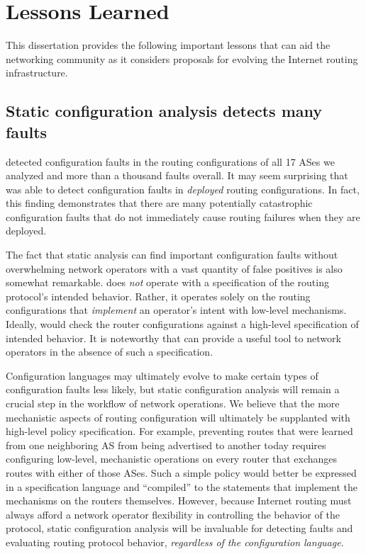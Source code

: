 \section{Lessons Learned}\label{sec:lessons}

This dissertation provides the following important lessons that can aid
the networking community as it considers proposals for evolving the
Internet routing infrastructure.

\subsection{Static configuration analysis detects many faults}

\rcc detected configuration faults in the routing configurations of all 17
ASes we analyzed and more than a thousand faults overall.  It may
seem surprising that \rcc was able to detect configuration faults in
{\em deployed} routing configurations.  In fact, this finding
demonstrates that there are many potentially catastrophic configuration
faults that do not immediately cause routing failures when they are
deployed.

The fact that static analysis can find important configuration faults
without overwhelming network operators with a vast quantity of false
positives is also somewhat remarkable.  \rcc does {\em not} operate with
a specification of the routing protocol's intended behavior.  Rather, it
operates solely on the routing configurations that {\em implement} an
operator's intent with low-level mechanisms.  Ideally, \rcc would check
the router configurations against a high-level specification of intended
behavior.  It is noteworthy that \rcc can provide a useful tool to
network operators in the absence of such a specification.

Configuration languages may ultimately evolve to make certain types of
configuration faults less likely, but static configuration analysis will
remain a crucial step in the workflow of network operations.  We believe
that the more mechanistic aspects of routing configuration will
ultimately be supplanted with high-level policy specification.  For
example, preventing routes that were learned from one neighboring
AS from being advertised to another today requires configuring
low-level, mechanistic operations on every router that exchanges routes
with either of those ASes.  Such a simple policy would better be
expressed in a specification language and ``compiled'' to the statements
that implement the mechanisms on the routers themselves.  However,
because Internet routing must always afford a network operator
flexibility in controlling the behavior of the protocol, static
configuration analysis will be invaluable for detecting faults and
evaluating routing protocol behavior, {\em
regardless of the configuration language}.  

